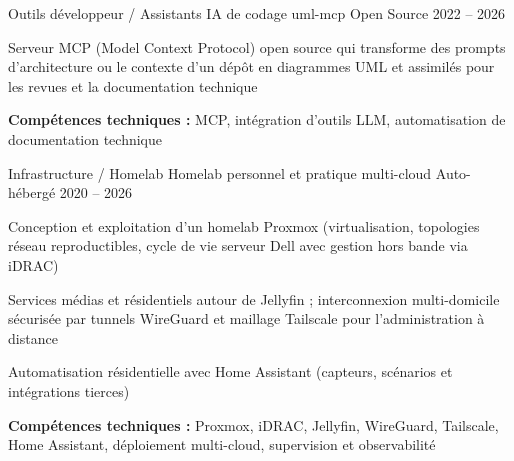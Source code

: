

\begin{cventries}

\cventry
    {Outils développeur / Assistants IA de codage} %
    {uml-mcp} %
    {Open Source} %
    {2022 -- 2026} %
    {
    \begin{cvitems} %
    \item {Serveur MCP (Model Context Protocol) open source qui transforme des prompts d'architecture ou le contexte d'un dépôt en diagrammes UML et assimilés pour les revues et la documentation technique}
    \item {\textbf{Compétences techniques :} MCP, intégration d'outils LLM, automatisation de documentation technique}
    \end{cvitems}
    }

\cventry
    {Infrastructure / Homelab} %
    {Homelab personnel et pratique multi-cloud} %
    {Auto-hébergé} %
    {2020 -- 2026} %
    {
    \begin{cvitems} %
    \item {Conception et exploitation d'un homelab Proxmox (virtualisation, topologies réseau reproductibles, cycle de vie serveur Dell avec gestion hors bande via iDRAC)}
    \item {Services médias et résidentiels autour de Jellyfin ; interconnexion multi-domicile sécurisée par tunnels WireGuard et maillage Tailscale pour l'administration à distance}
    \item {Automatisation résidentielle avec Home Assistant (capteurs, scénarios et intégrations tierces)}
    \item {\textbf{Compétences techniques :} Proxmox, iDRAC, Jellyfin, WireGuard, Tailscale, Home Assistant, déploiement multi-cloud, supervision et observabilité}
    \end{cvitems}
    }


\end{cventries}
